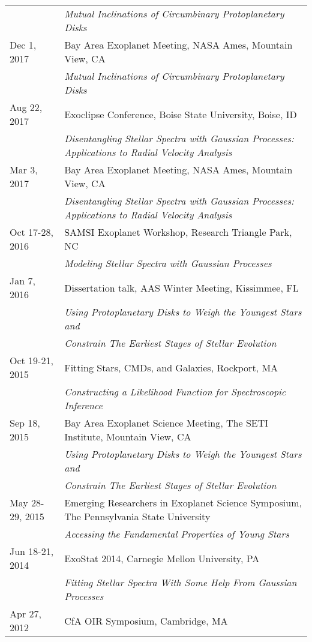 \begin{longtable}{@{\hspace{10pt}}p{1.2in}l}
  & \emph{Mutual Inclinations of Circumbinary Protoplanetary Disks} \\[\rowskip]
  Dec 1, 2017 & Bay Area Exoplanet Meeting, NASA Ames, Mountain View, CA\\
  & \emph{Mutual Inclinations of Circumbinary Protoplanetary Disks} \\[\rowskip]
  Aug 22, 2017 & Exoclipse Conference, Boise State University, Boise, ID\\
  & \emph{Disentangling Stellar Spectra with Gaussian Processes: Applications to Radial Velocity Analysis} \\[\rowskip]
  Mar 3, 2017 & Bay Area Exoplanet Meeting, NASA Ames, Mountain View, CA\\
  & \emph{Disentangling Stellar Spectra with Gaussian Processes: Applications to Radial Velocity Analysis} \\[\rowskip]
  Oct 17-28, 2016 & SAMSI Exoplanet Workshop, Research Triangle Park, NC\\
  & \emph{Modeling Stellar Spectra with Gaussian Processes} \\[\rowskip]
  Jan 7, 2016 & Dissertation talk, AAS Winter Meeting, Kissimmee, FL \\
  & \emph{Using Protoplanetary Disks to Weigh the Youngest Stars and} \\
  & \emph{Constrain The Earliest Stages of Stellar Evolution} \\[\rowskip]
  Oct 19-21, 2015 & Fitting Stars, CMDs, and Galaxies, Rockport, MA \\
  & \emph{Constructing a Likelihood Function for Spectroscopic Inference}\\[\rowskip]
  Sep 18, 2015 & Bay Area Exoplanet Science Meeting, The SETI Institute, Mountain View, CA \\
  & \emph{Using Protoplanetary Disks to Weigh the Youngest Stars and} \\
  & \emph{Constrain The Earliest Stages of Stellar Evolution} \\[\rowskip]
  May 28-29, 2015 & Emerging Researchers in Exoplanet Science Symposium, The Pennsylvania State University\\
  & \emph{Accessing the Fundamental Properties of Young Stars} \\[\rowskip]
  Jun 18-21, 2014 & ExoStat 2014, Carnegie Mellon University, PA \\
  & \emph{Fitting Stellar Spectra With Some Help From Gaussian Processes} \\[\rowskip]
  Apr 27, 2012 & CfA OIR Symposium, Cambridge, MA \\

\end{longtable}
